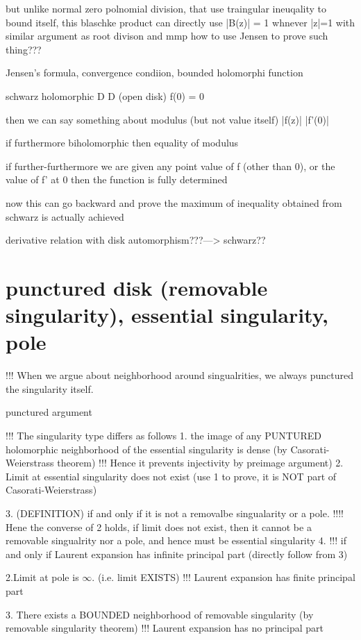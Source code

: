 {{	but unlike normal zero polnomial division, that use traingular ineuqality to bound itself, this blaschke product can directly use |B(z)| = 1 whnever |z|=1
	with similar argument as root divison and mmp
	how to use Jensen to prove such thing???
	
	
	
	Jensen's formula, convergence condiion, bounded holomorphi function

schwarz
holomorphic D \to D (open disk)
f(0) = 0

then we can say something about modulus (but not value itself)
	|f(z)|	|f'(0)|

if furthermore biholomorphic
	then equality of modulus

if further-furthermore we are given
any point value of f (other than 0), or the value of f' at 0
then the function is fully determined

now this can go backward and prove the maximum of inequality obtained from schwarz is actually achieved

derivative relation with disk automorphism???---> schwarz??

\section*{punctured disk (removable singularity), essential singularity, pole}

!!! When we argue about neighborhood around singualrities, we always punctured the singularity itself.

punctured argument

!!! The singularity type differs as follows
	1. the image of any PUNTURED holomorphic neighborhood of the essential singularity is dense (by Casorati-Weierstrass theorem)
		!!! Hence it prevents injectivity by preimage argument)
	2. Limit at essential singularity does not exist  (use 1 to prove, it is NOT part of Casorati-Weierstrass)
    	
	3. (DEFINITION) if and only if it is not a removalbe singualarity or a pole. 	
		!!!! Hene the converse of 2 holds, if limit does not exist, then it cannot be a removable singualrity nor a pole, and hence must be essential singularity
	4. !!! if and only if Laurent expansion has infinite principal part (directly follow from 3)




	2.Limit at pole is $\infty$. (i.e. limit EXISTS)
	!!! Laurent expansion has finite principal part


    3. There exists a BOUNDED neighborhood of removable singularity (by removable singularity theorem)
    	!!! Laurent expansion has no principal part
	
}}
